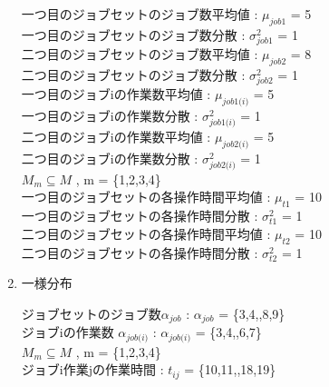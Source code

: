 \documentclass[twocolumn]{jarticle}
\begin{document}
\begin{enumerate}
    一つ目のジョブセットのジョブ数平均値 : $\mu_{\textit{job1}}$ = 5\\
    一つ目のジョブセットのジョブ数分散 : $\sigma^2_{\textit{job1}}$ = 1\\
    二つ目のジョブセットのジョブ数平均値 : $\mu_{\textit{job2}}$ = 8\\
    二つ目のジョブセットのジョブ数分散 : $\sigma^2_{\textit{job2}}$ = 1\\
    一つ目のジョブiの作業数平均値 : $\mu_\textit{job1(i)}$ = 5\\
    一つ目のジョブiの作業数分散 : $\sigma^2_\textit{job1(i)}$ = 1\\
    二つ目のジョブiの作業数平均値 : $\mu_\textit{job2(i)}$ = 5\\
    二つ目のジョブiの作業数分散 : $\sigma^2_\textit{job2(i)}$ = 1\\
    $\textit{M}_{\textit{m}} \subseteq \textit{M}$ , m = \{1,2,3,4\}\\
    一つ目のジョブセットの各操作時間平均値 : $\mu_{\textit{t1}}$ = 10\\
    一つ目のジョブセットの各操作時間分散 : $\sigma^2_{\textit{t1}}$ = 1\\
    二つ目のジョブセットの各操作時間平均値 : $\mu_{\textit{t2}}$ = 10\\
    二つ目のジョブセットの各操作時間分散 : $\sigma^2_{\textit{t2}}$ = 1\\

    \item 一様分布
    
    ジョブセットのジョブ数$\alpha_{\textit{job}}$ : $\alpha_{\textit{job}}$ =  \{3,4,\textellipsis,8,9\}\\
    ジョブiの作業数 $\alpha_{\textit{job(i)}}$ : $\alpha_{\textit{job(i)}}$ = \{3,4,\textellipsis,6,7\}\\
    $\textit{M}_{\textit{m}} \subseteq \textit{M}$ , m = \{1,2,3,4\}\\
    ジョブi作業jの作業時間 : $t_{\textit{ij}}$ = \{10,11,\textellipsis,18,19\}\\
    
    \end{enumerate}
\end{document}
